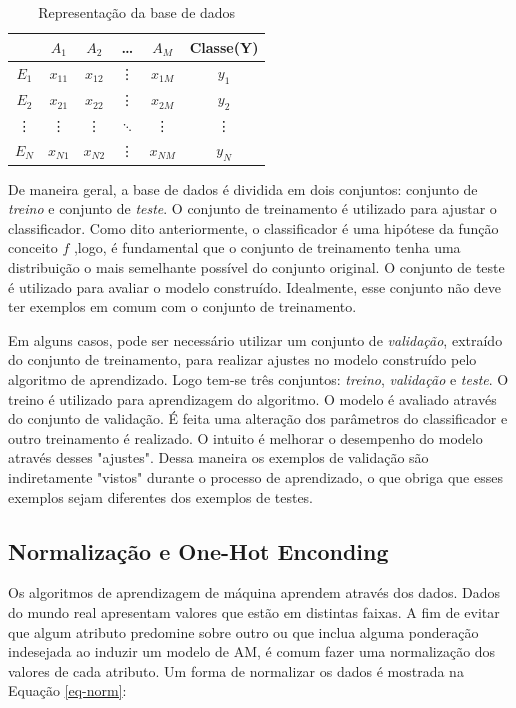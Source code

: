 \begin{table}[]
	\centering
	\begin{tabular}{c|cccc|c}
		\hline
		& $A_1$ & $A_2$ & \dots & $A_M$  & Classe(Y) \\
		\hline 
		\hline
		$E_1$ & $x_{11}$ & $x_{12}$ & \vdots & $x_{1M}$ & $y_1$ \\
		$E_2$ & $x_{21}$ & $x_{22}$ & \vdots & $x_{2M}$ & $y_2$ \\
		\vdots & \vdots & \vdots &  $\ddots$ & \vdots & \vdots \\
		$E_N$ & $x_{N1}$ & $x_{N2}$ & \vdots & $x_{NM}$ & $y_N$ \\
		\hline
		
		
	\end{tabular}	
	\caption{Representação da base de dados}
	\label{table-dataset}
\end{table}


De maneira geral, a base de dados é dividida em dois conjuntos: conjunto de \textit{treino} e conjunto de \textit{teste}. O conjunto de treinamento é utilizado para ajustar o classificador. Como dito anteriormente, o classificador é uma hipótese da função conceito $f$ ,logo, é fundamental que o conjunto de treinamento tenha uma distribuição o mais semelhante possível do conjunto original.  O conjunto de teste é utilizado para avaliar o modelo construído. Idealmente, esse conjunto não deve ter exemplos em comum com o conjunto de treinamento.

Em alguns casos, pode ser necessário utilizar um conjunto de \textit{validação}, extraído do conjunto de treinamento, para realizar ajustes no modelo construído pelo algoritmo de aprendizado. Logo tem-se três conjuntos: \textit{treino}, \textit{validação} e \textit{teste}. O treino é utilizado para aprendizagem do algoritmo. O modelo é avaliado através do conjunto de validação. É feita uma alteração dos parâmetros do classificador e outro treinamento é realizado. O intuito é melhorar o desempenho do modelo através desses "ajustes". Dessa maneira os exemplos de validação são indiretamente "vistos" durante o processo de aprendizado, o que obriga que esses exemplos sejam diferentes dos exemplos de testes.

\subsection{Normalização e One-Hot Enconding}
Os algoritmos de aprendizagem de máquina aprendem através dos dados. Dados do mundo real apresentam valores que estão em distintas faixas. A fim de evitar que algum atributo predomine sobre outro ou que inclua alguma ponderação indesejada ao induzir um modelo de AM, é comum fazer uma normalização dos valores de cada atributo. Um forma de normalizar os dados é mostrada na Equação \ref{eq-norm}:

